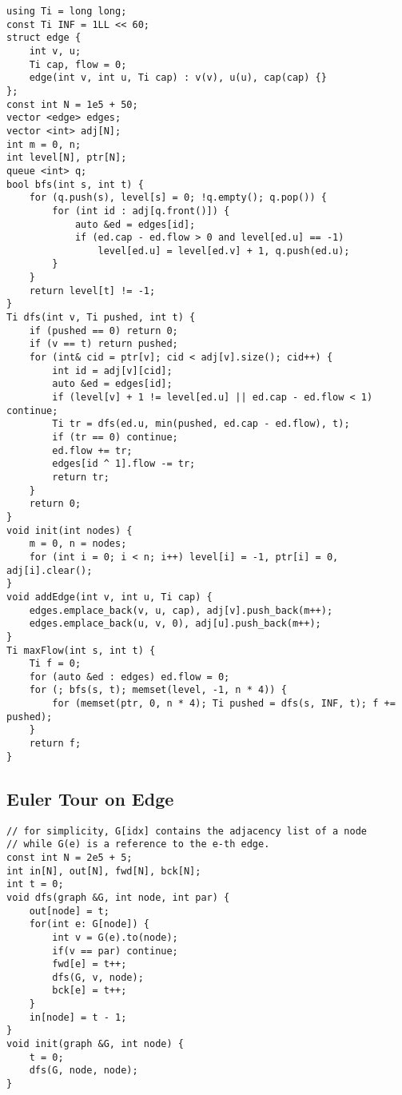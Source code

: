 \documentclass[FSZ,a4paper,onesided]{article}
\begin{document}
\begin{multicols*}{\COLS}
\begin{lstlisting}
using Ti = long long;
const Ti INF = 1LL << 60;
struct edge {
    int v, u;
    Ti cap, flow = 0;
    edge(int v, int u, Ti cap) : v(v), u(u), cap(cap) {}
};
const int N = 1e5 + 50;
vector <edge> edges;
vector <int> adj[N];
int m = 0, n;
int level[N], ptr[N];
queue <int> q;
bool bfs(int s, int t) {
    for (q.push(s), level[s] = 0; !q.empty(); q.pop()) {
        for (int id : adj[q.front()]) {
            auto &ed = edges[id];
            if (ed.cap - ed.flow > 0 and level[ed.u] == -1)
                level[ed.u] = level[ed.v] + 1, q.push(ed.u);
        }
    }
    return level[t] != -1;
}
Ti dfs(int v, Ti pushed, int t) {
    if (pushed == 0) return 0;
    if (v == t) return pushed;
    for (int& cid = ptr[v]; cid < adj[v].size(); cid++) {
        int id = adj[v][cid];
        auto &ed = edges[id];
        if (level[v] + 1 != level[ed.u] || ed.cap - ed.flow < 1) continue;
        Ti tr = dfs(ed.u, min(pushed, ed.cap - ed.flow), t);
        if (tr == 0) continue;
        ed.flow += tr;
        edges[id ^ 1].flow -= tr;
        return tr;
    }
    return 0;
}
void init(int nodes) {
    m = 0, n = nodes;
    for (int i = 0; i < n; i++) level[i] = -1, ptr[i] = 0, adj[i].clear();
}
void addEdge(int v, int u, Ti cap) {
    edges.emplace_back(v, u, cap), adj[v].push_back(m++);
    edges.emplace_back(u, v, 0), adj[u].push_back(m++);
}
Ti maxFlow(int s, int t) {
    Ti f = 0;
    for (auto &ed : edges) ed.flow = 0;
    for (; bfs(s, t); memset(level, -1, n * 4)) {
        for (memset(ptr, 0, n * 4); Ti pushed = dfs(s, INF, t); f += pushed);
    }
    return f;
}
\end{lstlisting}
\subsection{Euler Tour on Edge}
\begin{lstlisting}
// for simplicity, G[idx] contains the adjacency list of a node
// while G(e) is a reference to the e-th edge.
const int N = 2e5 + 5;
int in[N], out[N], fwd[N], bck[N];
int t = 0;
void dfs(graph &G, int node, int par) {
    out[node] = t; 
    for(int e: G[node]) {
        int v = G(e).to(node);
        if(v == par) continue;
        fwd[e] = t++;
        dfs(G, v, node);
        bck[e] = t++;
    }
    in[node] = t - 1;
}
void init(graph &G, int node) {
    t = 0;
    dfs(G, node, node);
}
\end{lstlisting}

\end{multicols*}
\end{document}
